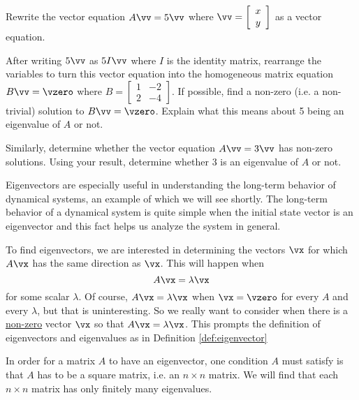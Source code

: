 \begin{pa}
\ba
	\item Rewrite the vector equation $A\vv=5\vv$ where $\vv = \left[ \begin{array}{c} x \\y \end{array} \right]$ as a vector equation.
	
	
	\item After writing $5\vv$ as $5I\vv$ where $I$ is the identity matrix, rearrange the variables to turn this vector equation into the homogeneous matrix equation $B\vv=\vzero$ where $B=\left[ \begin{array}{cr} 1 & -2\\2 & -4 \end{array} \right]$. If possible, find a non-zero (i.e. a non-trivial) solution to $B\vv=\vzero$. Explain what this means about 5 being an eigenvalue of $A$ or not. 


\item Similarly, determine whether the vector equation $A\vv=3\vv$ has non-zero solutions. Using your result, determine whether 3 is an eigenvalue of $A$ or not.

\ea

\ee
\end{pa}


\label{sec:eigval_eigvec}

Eigenvectors are especially useful in understanding the long-term behavior of dynamical systems, an example of which we will see shortly. The long-term behavior of a dynamical system is quite simple when the initial state vector is an eigenvector and this fact helps us analyze the system in general. 

To find eigenvectors, we are interested in determining the vectors $\vx$ for which $A\vx$ has the same direction as $\vx$. This will happen when
\[A\vx = \lambda \vx\]
for some scalar $\lambda$. Of course, $A\vx = \lambda \vx$ when $\vx = \vzero$ for every $A$ and every $\lambda$, but that is uninteresting. So we really want to consider when there is a \underline{non-zero} vector $\vx$ so that $A\vx = \lambda \vx$. This prompts the definition of eigenvectors and eigenvalues as in Definition \ref{def:eigenvector} 


In order for a matrix $A$ to have an eigenvector, one condition $A$ must satisfy is that $A$ has to be a square matrix, i.e. an $n \times n$ matrix. We will find that each $n\times n$ matrix has only finitely many eigenvalues.


